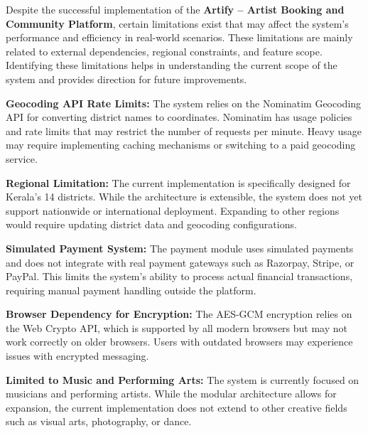 \documentclass[12pt,a4paper]{report}
\begin{document}
Despite the successful implementation of the \textbf{Artify -- Artist Booking and Community Platform}, certain limitations exist that may affect the system's performance and efficiency in real-world scenarios. These limitations are mainly related to external dependencies, regional constraints, and feature scope. Identifying these limitations helps in understanding the current scope of the system and provides direction for future improvements.

\textbf{Geocoding API Rate Limits:}
The system relies on the Nominatim Geocoding API for converting district names to coordinates. Nominatim has usage policies and rate limits that may restrict the number of requests per minute. Heavy usage may require implementing caching mechanisms or switching to a paid geocoding service.

\vspace{0.3cm}

\textbf{Regional Limitation:}
The current implementation is specifically designed for Kerala's 14 districts. While the architecture is extensible, the system does not yet support nationwide or international deployment. Expanding to other regions would require updating district data and geocoding configurations.

\vspace{0.3cm}

\textbf{Simulated Payment System:}
The payment module uses simulated payments and does not integrate with real payment gateways such as Razorpay, Stripe, or PayPal. This limits the system's ability to process actual financial transactions, requiring manual payment handling outside the platform.

\vspace{0.3cm}

\textbf{Browser Dependency for Encryption:}
The AES-GCM encryption relies on the Web Crypto API, which is supported by all modern browsers but may not work correctly on older browsers. Users with outdated browsers may experience issues with encrypted messaging.

\vspace{0.3cm}

\textbf{Limited to Music and Performing Arts:}
The system is currently focused on musicians and performing artists. While the modular architecture allows for expansion, the current implementation does not extend to other creative fields such as visual arts, photography, or dance.

\vspace{0.3cm}
\end{document}
